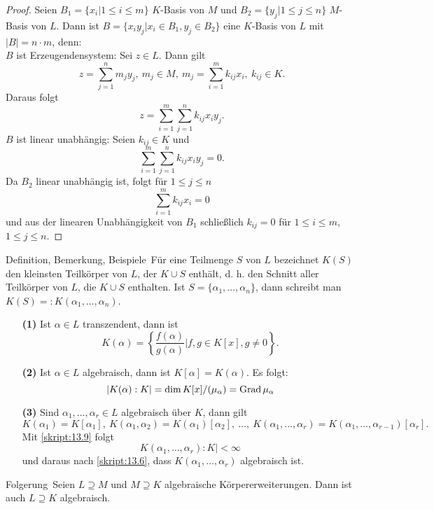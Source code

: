 \begin{proof}
	Seien $B_1=\{x_i|1\leq i\leq m\}$ $K$-Basis von $M$ und $B_2=\{y_j|1\leq j\leq n\}$ $M$-Basis von $L$. Dann ist $B=\{x_iy_j|x_i\in B_1, y_j\in B_2\}$ eine $K$-Basis von $L$ mit $|B|=n\cdot m$, denn:\\
	$B$ ist Erzeugendensystem: Sei $z\in L$. Dann gilt
	\[z=\sum_{j=1}^n m_jy_j, \ m_j\in M, \ m_j=\sum_{i=1}^m k_{ij}x_i, \ k_{ij}\in K.\]
	Daraus folgt
	\[z=\sum_{i=1}^m\sum_{j=1}^n k_{ij}x_iy_j.\]
	$B$ ist linear unabhängig: Seien $k_{ij}\in K$ und
	\[\sum_{i=1}^m\sum_{j=1}^n k_{ij}x_iy_j=0.\]
	Da $B_2$ linear unabhängig ist, folgt für $1\leq j\leq n$
	\[\sum_{i=1}^m k_{ij}x_i=0\]
	und aus der linearen Unabhängigkeit von $B_1$ schließlich $k_{ij}=0$ für $1\leq i\leq m$, $1\leq j\leq n$.
\end{proof}

\begin{genericdf}{Definition, Bemerkung, Beispiele}\label{skript:13.10}\
	Für eine Teilmenge $S$ von $L$ bezeichnet $K(S)$ den kleinsten Teilkörper von $L$, der $K\cup S$ enthält, d. h. den Schnitt aller Teilkörper von $L$, die $K\cup S$ enthalten. Ist $S=\{\alpha_1,\ldots,\alpha_n\}$, dann schreibt man $K(S)=:K(\alpha_1,\ldots,\alpha_n)$.
	\begin{enumerate}
		\item[\textbf{(1)}]
		Ist $\alpha\in L$ transzendent, dann ist
		\[K(\alpha)=\left\{\frac{f(\alpha)}{g(\alpha)}|f,g\in K[x], g\neq0\right\}.\]
		\item[\textbf{(2)}]
		Ist $\alpha\in L$ algebraisch, dann ist $K[\alpha]=K(\alpha)$. Es folgt:
		\[|K(\alpha):K|=\dim K[x]/(\mu_\alpha)=\operatorname{Grad} \mu_\alpha\]
		\item[\textbf{(3)}]
		Sind $\alpha_1,\ldots,\alpha_r\in L$ algebraisch über $K$, dann gilt
		\[K(\alpha_1)=K[\alpha_1], \ K(\alpha_1,\alpha_2)=K(\alpha_1)[\alpha_2], \ \ldots, \ K(\alpha_1,\ldots,\alpha_r)=K(\alpha_1,\ldots,\alpha_{r-1})[\alpha_r].\]
		Mit \ref{skript:13.9} folgt
		\[K(\alpha_1,\ldots,\alpha_r):K|<\infty\]
		und daraus nach \ref{skript:13.6}, dass $K(\alpha_1,\ldots,\alpha_r)$ algebraisch ist.
	\end{enumerate}
\end{genericdf}

\begin{genericdf}{Folgerung}\label{skript:13.11}\
	Seien $L\supseteq M$ und $M\supseteq K$ algebraische Körpererweiterungen. Dann ist auch $L\supseteq K$ algebraisch.
\end{genericdf}

